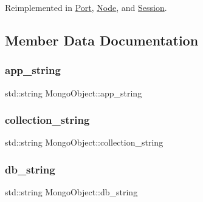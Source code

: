Reimplemented in \hyperlink{class_port_a052c0ba97e0a53e45d973d4bc31fa615}{Port}, \hyperlink{class_node_ad5cacb320e423275faef1bfc8c7a365b}{Node}, and \hyperlink{class_session_a513e5436b4c990985300246bb39d9f5c}{Session}.



\subsection{Member Data Documentation}
\mbox{\label{class_mongo_object_ace5148b45dd674c73077a044d0233ed8}} 
\subsubsection{\texorpdfstring{app\+\_\+string}{app\_string}}
{\footnotesize\ttfamily std\+::string Mongo\+Object\+::app\+\_\+string\hspace{0.3cm}{\ttfamily [protected]}}

\mbox{\label{class_mongo_object_a59d2d926fd2f8048b1dab88b3e1fea5b}} 
\subsubsection{\texorpdfstring{collection\+\_\+string}{collection\_string}}
{\footnotesize\ttfamily std\+::string Mongo\+Object\+::collection\+\_\+string\hspace{0.3cm}{\ttfamily [protected]}}

\mbox{\label{class_mongo_object_a215dc4379af5ac81e19d245f5d5d37e0}} 
\subsubsection{\texorpdfstring{db\+\_\+string}{db\_string}}
{\footnotesize\ttfamily std\+::string Mongo\+Object\+::db\+\_\+string\hspace{0.3cm}{\ttfamily [protected]}}

